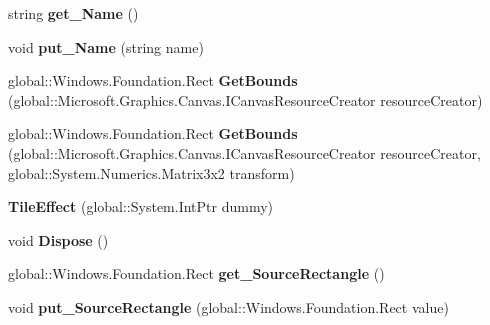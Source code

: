 \begin{DoxyCompactItemize}
string {\bfseries get\+\_\+\+Name} ()
\item 
\mbox{\label{class_microsoft_1_1_graphics_1_1_canvas_1_1_effects_1_1_tile_effect_af926c062b59f800140ad8bf045385da8}} 
void {\bfseries put\+\_\+\+Name} (string name)
\item 
\mbox{\label{class_microsoft_1_1_graphics_1_1_canvas_1_1_effects_1_1_tile_effect_ab750c6e9b586d8a61f8aa73d8c345adc}} 
global\+::\+Windows.\+Foundation.\+Rect {\bfseries Get\+Bounds} (global\+::\+Microsoft.\+Graphics.\+Canvas.\+I\+Canvas\+Resource\+Creator resource\+Creator)
\item 
\mbox{\label{class_microsoft_1_1_graphics_1_1_canvas_1_1_effects_1_1_tile_effect_abe0663f59fe2ba4b80be6f46ca4198c8}} 
global\+::\+Windows.\+Foundation.\+Rect {\bfseries Get\+Bounds} (global\+::\+Microsoft.\+Graphics.\+Canvas.\+I\+Canvas\+Resource\+Creator resource\+Creator, global\+::\+System.\+Numerics.\+Matrix3x2 transform)
\item 
\mbox{\label{class_microsoft_1_1_graphics_1_1_canvas_1_1_effects_1_1_tile_effect_aa107fd2365bf30bb4bc757c8f23570cb}} 
{\bfseries Tile\+Effect} (global\+::\+System.\+Int\+Ptr dummy)
\item 
\mbox{\label{class_microsoft_1_1_graphics_1_1_canvas_1_1_effects_1_1_tile_effect_a82911fbdb206a47dd070948da25b15b2}} 
void {\bfseries Dispose} ()
\item 
\mbox{\label{class_microsoft_1_1_graphics_1_1_canvas_1_1_effects_1_1_tile_effect_ab1844baf6fd7b1291017af32256cb757}} 
global\+::\+Windows.\+Foundation.\+Rect {\bfseries get\+\_\+\+Source\+Rectangle} ()
\item 
\mbox{\label{class_microsoft_1_1_graphics_1_1_canvas_1_1_effects_1_1_tile_effect_a1a2a8a43669447290f1788aeafe2a795}} 
void {\bfseries put\+\_\+\+Source\+Rectangle} (global\+::\+Windows.\+Foundation.\+Rect value)

\end{DoxyCompactItemize}
